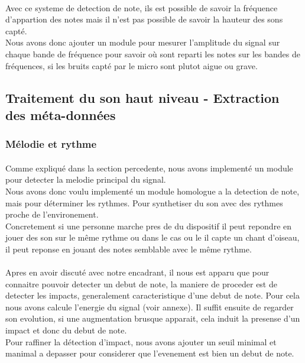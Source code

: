 \documentclass[a4paper, titlepage, oneside, 12pt]{article}%
\begin{document}
\paragraph{}
Avec ce systeme de detection de note, ils est possible de savoir la fréquence d'appartion des notes mais il n'est pas possible de savoir la hauteur des sons capté.\\
Nous avons donc ajouter un module pour mesurer l'amplitude du signal sur chaque bande de fréquence pour savoir où sont reparti les notes sur les bandes de fréquences, si les bruits capté par le micro sont plutot aigue ou grave.

\subsection{Traitement du son haut niveau - Extraction des méta-données}
\subsubsection{Mélodie et rythme}
\paragraph{}
Comme expliqué dans la section percedente, nous avons implementé un module pour detecter la melodie principal du signal.\\
Nous avons donc voulu implementé un module homologue a la detection de note, mais pour déterminer les rythmes. Pour synthetiser du son avec des rythmes proche de l'environement.\\
Concretement si une personne marche pres de du dispositif il peut repondre en jouer des son sur le même rythme ou dans le cas ou le il capte un chant d'oiseau, il peut reponse en jouant des notes semblable avec le même rythme.\\

\paragraph{}
Apres en avoir discuté avec notre encadrant, il nous est apparu que pour connaitre pouvoir detecter un debut de note, la maniere de proceder est de detecter les impacts, generalement caracteristique d'une debut de note. Pour cela  nous avons calcule l'energie du signal (voir annexe). 
Il suffit ensuite de regarder son evolution, si une augmentation brusque apparait, cela induit la presense d'un impact et donc du debut de note.\\
Pour raffiner la détection d'impact, nous avons ajouter un seuil minimal et manimal a depasser pour considerer que l'evenement est bien un debut de note.
 
\end{document}

